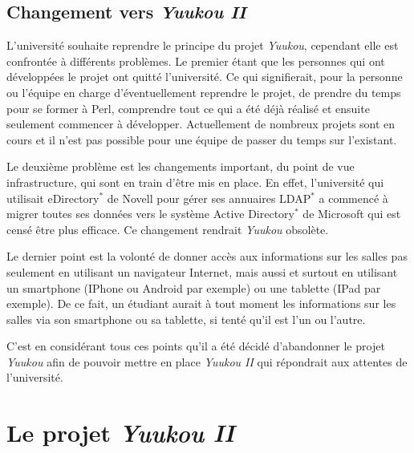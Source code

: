 \subsection{Changement vers \textit{Yuukou II}}

L'universit\'e souhaite reprendre le principe du projet \textit{Yuukou}, cependant elle est confront\'ee \`a diff\'erents probl\`emes.
Le premier \'etant que les personnes qui ont d\'evelopp\'ees le projet ont quitt\'e l'universit\'e. 
Ce qui signifierait, pour la personne ou l'\'equipe en charge d'\'eventuellement reprendre le projet, de prendre du temps pour se former \`a Perl, comprendre tout ce qui a \'et\'e d\'ej\`a r\'ealis\'e et ensuite seulement commencer \`a d\'evelopper.
Actuellement de nombreux projets sont en cours et il n'est pas possible pour une \'equipe de passer du temps sur l'existant.

Le deuxi\`eme probl\`eme est les changements important, du point de vue infrastructure, qui sont en train d'\^etre mis en place.
En effet, l'universit\'e qui utilisait eDirectory$^*$ de Novell pour g\'erer ses annuaires LDAP$^*$ a commenc\'e \`a migrer toutes ses donn\'ees vers le syst\`eme Active Directory$^*$ de Microsoft qui est cens\'e \^etre plus efficace. Ce changement rendrait \textit{Yuukou} obsol\`ete.

Le dernier point est la volont\'e de donner acc\`es aux informations sur les salles pas seulement en utilisant un navigateur Internet, mais aussi et surtout en utilisant un smartphone (IPhone ou Android par exemple) ou une tablette (IPad par exemple).
De ce fait, un \'etudiant aurait \`a tout moment les informations sur les salles via son smartphone ou sa tablette, si tent\'e qu'il est l'un ou l'autre.

C'est en consid\'erant tous ces points qu'il a \'et\'e d\'ecid\'e d'abandonner le projet \textit{Yuukou} afin de pouvoir mettre en place \textit{Yuukou II} qui r\'epondrait aux attentes de l'universit\'e.

\section{Le projet \textit{Yuukou II}}

\clearpage
